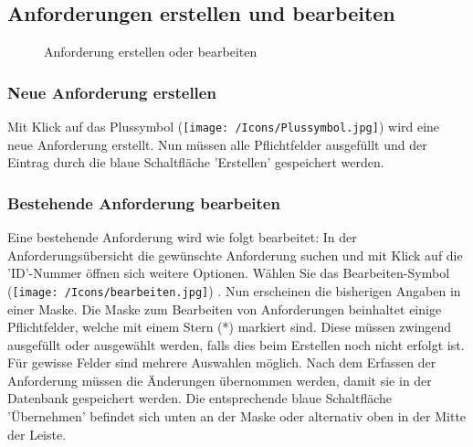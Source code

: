\begin{figure}[H]
\end{figure}

\subsection{Anforderungen erstellen und bearbeiten}
\label{bkm:Ref2018071810}

\begin{figure}[H]
\caption{Anforderung erstellen oder bearbeiten}
\end{figure}

\subsubsection{Neue Anforderung erstellen}

Mit Klick auf das Plussymbol (\texttt{[image: /Icons/Plussymbol.jpg]})  wird eine neue Anforderung erstellt. Nun müssen alle Pflichtfelder ausgefüllt und der Eintrag durch die blaue Schaltfläche 'Erstellen' gespeichert werden. 

\subsubsection{Bestehende Anforderung bearbeiten}

Eine bestehende Anforderung wird wie folgt bearbeitet: In der Anforderungsübersicht die gewünschte Anforderung suchen und mit Klick auf die 'ID'-Nummer  öffnen sich weitere Optionen. Wählen Sie das Bearbeiten-Symbol (\texttt{[image: /Icons/bearbeiten.jpg]}) . Nun erscheinen die bisherigen Angaben in einer Maske. Die Maske zum Bearbeiten von Anforderungen beinhaltet einige Pflichtfelder, welche mit einem Stern (*) markiert sind. Diese müssen zwingend ausgefüllt oder ausgewählt werden, falls dies beim Erstellen noch nicht erfolgt ist. Für gewisse Felder sind mehrere Auswahlen möglich. Nach dem Erfassen der Anforderung müssen die Änderungen übernommen werden, damit sie in der Datenbank gespeichert werden. Die entsprechende blaue Schaltfläche 'Übernehmen' befindet sich unten an der Maske oder alternativ oben in der Mitte der Leiste. \\

